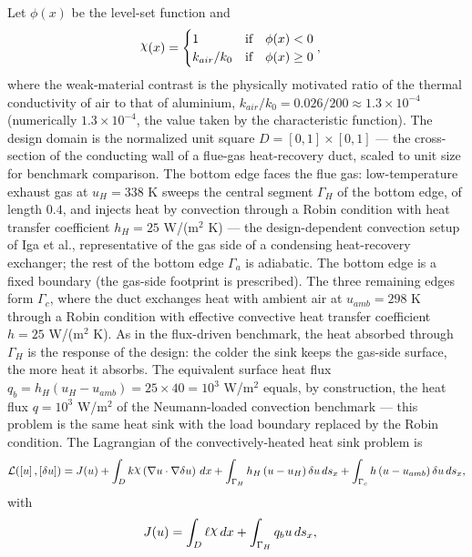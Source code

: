 \documentclass[preview]{standalone}
\let\oldcdot\cdot
\let\cdot\oldcdot
\begin{document}
Let $\phi(x)$ be the level-set function and
 \begin{align*}\raisebox{\depth}{$\chi$}(x) &= \begin{cases} 1 & \mbox{if}\quad \phi(x) < 0 \\ k_{air}/k_0 & \mbox{if}\quad \phi(x)  \ge 0 \end{cases},\end{align*}
where the weak-material contrast is the physically motivated ratio of the thermal conductivity of air to that of aluminium, $k_{air}/k_0 = 0.026/200 \approx 1.3 \times 10^{-4}$ (numerically $1.3 \times 10^{-4}$, the value taken by the characteristic function).
The design domain is the normalized unit square $D = [0,1] \times [0,1]$ — the cross-section of the conducting wall of a flue-gas heat-recovery duct, scaled to unit size for benchmark comparison.  The bottom edge faces the flue gas: low-temperature exhaust gas at $u_{H} = 338$ K sweeps the central segment $\Gamma_H$ of the bottom edge, of length $0.4$, and injects heat by convection through a Robin condition with heat transfer coefficient $h_{H} = 25$ W/(m$^{2}$ K) — the design-dependent convection setup of Iga et al., representative of the gas side of a condensing heat-recovery exchanger; the rest of the bottom edge $\Gamma_a$ is adiabatic.  The bottom edge is a fixed boundary (the gas-side footprint is prescribed).  The three remaining edges form $\Gamma_c$, where the duct exchanges heat with ambient air at $u_{amb} = 298$ K through a Robin condition with effective convective heat transfer coefficient $h = 25$ W/(m$^{2}$ K).  As in the flux-driven benchmark, the heat absorbed through $\Gamma_H$ is the response of the design: the colder the sink keeps the gas-side surface, the more heat it absorbs.  The equivalent surface heat flux $q_b = h_{H} \left( u_{H} - u_{amb}\right) = 25 \times 40 = 10^{3}$ W/m$^{2}$ equals, by construction, the heat flux $q = 10^{3}$ W/m$^{2}$ of the Neumann-loaded convection benchmark — this problem is the same heat sink with the load boundary replaced by the Robin condition.
The Lagrangian of the convectively-heated heat sink problem is
\begin{dmath*}
\mathcal L(\left[ u\right],\left[ \delta u\right]) = J(u) +  \int_{D} k \raisebox{\depth}{$\chi$} \left(  \nabla u  \cdot  \nabla \delta u  \right) \,dx + \int_{\Gamma_H} h_H \left( u - u_{H}\right) \delta u \,ds_x + \int_{\Gamma_c} h \left( u - u_{amb}\right) \delta u \,ds_x ,
\end{dmath*}
with
\begin{align*}
J(u) &=  \int_{D} \ell \raisebox{\depth}{$\chi$} \,dx + \int_{\Gamma_H} q_b u \,ds_x ,
 \end{align*}
\end{document}
